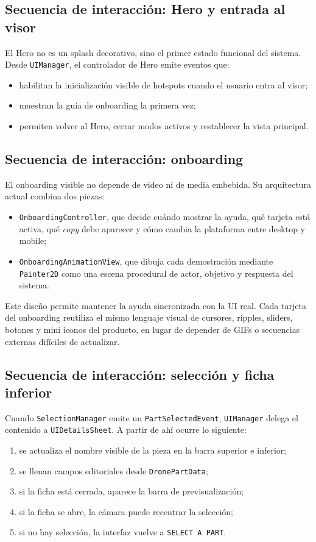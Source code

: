 \documentclass[12pt,letterpaper]{article}
\begin{document}
\subsection{Secuencia de interacción: Hero y entrada al visor}
El Hero no es un splash decorativo, sino el primer estado funcional del sistema. Desde \texttt{UIManager}, el controlador de Hero emite eventos que:
\begin{itemize}
    \item habilitan la inicialización visible de hotspots cuando el usuario entra al visor;
    \item muestran la guía de onboarding la primera vez;
    \item permiten volver al Hero, cerrar modos activos y restablecer la vista principal.
\end{itemize}

\subsection{Secuencia de interacción: onboarding}
El onboarding visible no depende de video ni de media embebida. Su arquitectura actual combina dos piezas:
\begin{itemize}
    \item \texttt{OnboardingController}, que decide cuándo mostrar la ayuda, qué tarjeta está activa, qué \textit{copy} debe aparecer y cómo cambia la plataforma entre desktop y mobile;
    \item \texttt{OnboardingAnimationView}, que dibuja cada demostración mediante \texttt{Painter2D} como una escena procedural de actor, objetivo y respuesta del sistema.
\end{itemize}

\noindent Este diseño permite mantener la ayuda sincronizada con la UI real. Cada tarjeta del onboarding reutiliza el mismo lenguaje visual de cursores, ripples, sliders, botones y mini iconos del producto, en lugar de depender de GIFs o secuencias externas difíciles de actualizar.

\subsection{Secuencia de interacción: selección y ficha inferior}
Cuando \texttt{SelectionManager} emite un \texttt{PartSelectedEvent}, \texttt{UIManager} delega el contenido a \texttt{UIDetailsSheet}. A partir de ahí ocurre lo siguiente:
\begin{enumerate}
    \item se actualiza el nombre visible de la pieza en la barra superior e inferior;
    \item se llenan campos editoriales desde \texttt{DronePartData};
    \item si la ficha está cerrada, aparece la barra de previsualización;
    \item si la ficha se abre, la cámara puede recentrar la selección;
    \item si no hay selección, la interfaz vuelve a \texttt{SELECT A PART}.
\end{enumerate}
\end{document}
